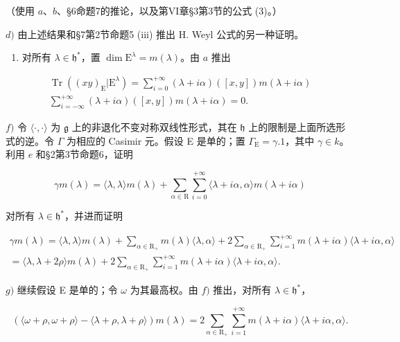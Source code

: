 （使用 \(a\)、\(b\)、§6命题7的推论，以及第VI章§3第3节的公式 (3)。）

\(d)\) 由上述结果和§7第2节命题5 (iii) 推出 H. Weyl 公式的另一种证明。

\begin{enumerate}
\def\labelenumi{\alph{enumi})}
\setcounter{enumi}{4}
\tightlist
\item
  对所有 \(\lambda \in \mathfrak{h}^*\)，置 \(\dim \mathrm{E}^{\lambda} = m(\lambda)\)。由 \(a\) 推出
\end{enumerate}

\[
\begin{array}{c} \operatorname{Tr} ((x y) _ {\mathrm{E}} | \mathrm{E} ^ {\lambda}) = \sum_ {i = 0} ^ {+ \infty} (\lambda + i \alpha) ([ x, y ]) m (\lambda + i \alpha) \\ \sum_ {i = - \infty} ^ {+ \infty} (\lambda + i \alpha) ([ x, y ]) m (\lambda + i \alpha) = 0. \end{array}
\]

\(f)\) 令 \(\langle\cdot,\cdot\rangle\) 为 \(\mathfrak{g}\) 上的非退化不变对称双线性形式，其在 \(\mathfrak{h}\) 上的限制是上面所选形式的逆。令 \(\Gamma\) 为相应的 Casimir 元。假设 E 是单的；置 \(\Gamma_{\mathrm{E}}=\gamma.1\)，其中 \(\gamma\in k\)。利用 \(e\) 和§2第3节命题6，证明

\[
\gamma m (\lambda) = \langle \lambda , \lambda \rangle m (\lambda) + \sum_ {\alpha \in \mathrm{R}} \sum_ {i = 0} ^ {+ \infty} \langle \lambda + i \alpha , \alpha \rangle m (\lambda + i \alpha)
\]

对所有 \(\lambda \in \mathfrak{h}^*\)，并进而证明

\[
\begin{array}{l} \gamma m (\lambda) = \langle \lambda , \lambda \rangle m (\lambda) + \sum_ {\alpha \in \mathrm{R} _ {+}} m (\lambda) \langle \lambda , \alpha \rangle + 2 \sum_ {\alpha \in \mathrm{R} _ {+}} \sum_ {i = 1} ^ {+ \infty} m (\lambda + i \alpha) \langle \lambda + i \alpha , \alpha \rangle \\ = \langle \lambda , \lambda + 2 \rho \rangle m (\lambda) + 2 \sum_ {\alpha \in \mathrm{R} _ {+}} \sum_ {i = 1} ^ {+ \infty} m (\lambda + i \alpha) \langle \lambda + i \alpha , \alpha \rangle . \end{array}
\]

\(g)\) 继续假设 E 是单的；令 \(\omega\) 为其最高权。由 \(f)\) 推出，对所有 \(\lambda \in \mathfrak{h}^*\)，

\[
(\langle \omega + \rho , \omega + \rho \rangle - \langle \lambda + \rho , \lambda + \rho \rangle) m (\lambda) = 2 \sum_ {\alpha \in \mathrm{R} _ {+}} \sum_ {i = 1} ^ {+ \infty} m (\lambda + i \alpha) \langle \lambda + i \alpha , \alpha \rangle .
\]

